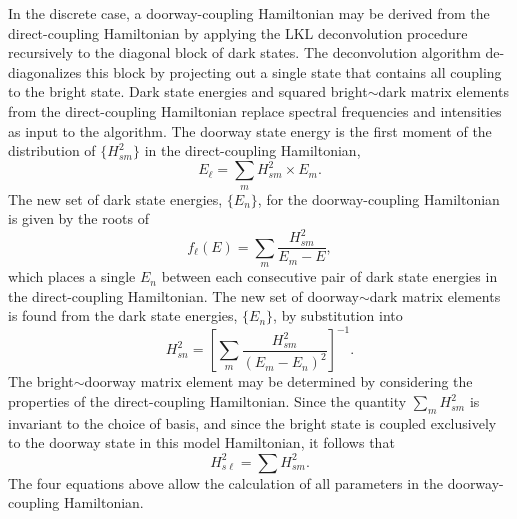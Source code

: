 \documentclass[12pt]{mitthesis}
\begin{document}
In the discrete case, a doorway-coupling Hamiltonian may be derived
from the direct-coupling Hamiltonian by applying the LKL deconvolution
procedure recursively to the diagonal block of dark states.  The
deconvolution algorithm de-diagonalizes this block by projecting out a
single state that contains all coupling to the bright state.  Dark
state energies and squared bright$\sim$dark matrix elements from the
direct-coupling Hamiltonian replace spectral frequencies and
intensities as input to the algorithm.  The doorway state energy is
the first moment of the distribution of $\lbrace H_{sm}^2 \rbrace$ in
the direct-coupling Hamiltonian,
\begin{equation}
  \label{eq:dse-discrete}
  E_{\ell} = \sum_m H_{sm}^2 \times E_m.
\end{equation}
The new set of dark state energies, $\lbrace E_n \rbrace$, for the
doorway-coupling Hamiltonian is given by the roots of
\begin{equation}
  f_{\ell}(E) = \sum_m \frac{H_{sm}^2}{E_m - E},
\end{equation}
which places a single $E_n$ between each consecutive pair of dark
state energies in the direct-coupling Hamiltonian.  The new set of
doorway$\sim$dark matrix elements is found from the dark state
energies, $\lbrace E_n \rbrace$, by substitution into
\begin{equation}
  H_{sn}^2 = 
  \left [
    \sum_m \frac{H_{sm}^2}{(E_m - E_n)^2}
  \right ]^{-1}.
\end{equation}
The bright$\sim$doorway matrix element may be determined by
considering the properties of the direct-coupling Hamiltonian.  Since
the quantity $\sum_m H_{sm}^2$ is invariant to the choice of basis,
and since the bright state is coupled exclusively to the doorway state
in this model Hamiltonian, it follows that
\begin{equation}
  \label{eq:doorway-me}
  H_{s\ell}^2 = \sum H_{sm}^2.
\end{equation}
The four equations above allow the calculation of all parameters in
the doorway-coupling Hamiltonian.
\end{document}
